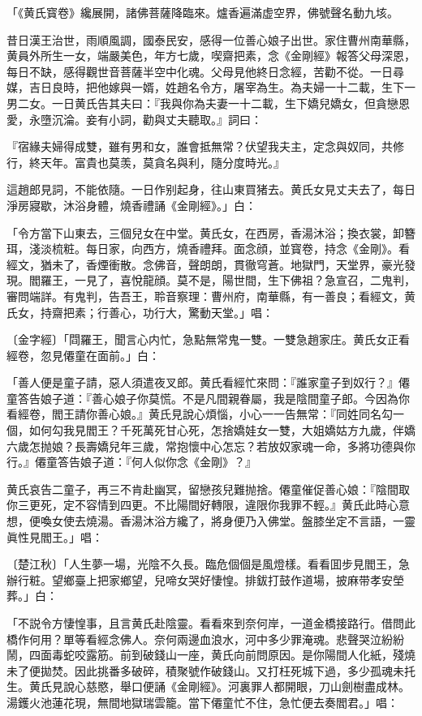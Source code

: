 \begin{myquote}[\markfont]
「《黄氏寳卷》纔展開，諸佛菩薩降臨來。爐香遍滿虚空界，佛號聲名動九垓。

昔日漢王治世，雨順風調，國泰民安，感得一位善心娘子出世。家住曹州南華縣，黄員外所生一女，端嚴美色，年方七歲，喫齋把素，念《金剛經》報答父母深恩，每日不缺，感得觀世音菩薩半空中化魂。父母見他終日念經，苦勸不從。一日尋媒，吉日良時，把他嫁與一婿，姓趙名令方，屠宰為生。為夫婦一十二載，生下一男二女。一日黄氏告其夫曰：『我與你為夫妻一十二載，生下嬌兒嬌女，但貪戀恩愛，永墮沉淪。妾有小詞，勸與丈夫聽取。』詞曰：

{\kaishu『宿緣夫婦得成雙，雖有男和女，誰會抵無常？伏望我夫主，定念與奴同，共修行，終天年。富貴也莫羡，莫貪名與利，隨分度時光。』}

這趙郎見詞，不能依隨。一日作别起身，往山東買猪去。黄氏女見丈夫去了，每日淨房寢歇，沐浴身體，燒香禮誦《金剛經》。」{\small{白}}：

「令方當下山東去，三個兒女在中堂。黄氏女，在西房，香湯沐浴；換衣裳，卸簪珥，淺淡梳粧。每日家，向西方，燒香禮拜。面念顔，並寳卷，持念《金剛》。看經文，猶未了，香煙衝散。念佛音，聲朗朗，貫徹穹蒼。地獄門，天堂界，豪光發現。閻羅王，一見了，喜悅龍顔。莫不是，陽世間，生下佛祖？急宣召，二鬼判，審問端詳。有鬼判，告吾王，聆音察理：曹州府，南華縣，有一善良；看經文，黄氏女，持齋把素；行善心，功行大，驚動天堂。」唱：

〔金字經〕{\kaishu「閰羅王，聞言心内忙，急點無常鬼一雙。一雙急趙家庄。黄氏女正看經卷，忽見僊童在面前。」}{\small{白}}：

「善人便是童子請，惡人須遣夜叉郎。黄氏看經忙來問：『誰家童子到奴行？』僊童答告娘子道：『善心娘子你莫慌。不是凡間親眷屬，我是陰間童子郎。今因為你看經卷，閻王請你善心娘。』黄氏見說心煩惱，小心一一告無常：『同姓同名勾一個，如何勾我見閻王？千死萬死甘心死，怎捨嬌娃女一雙，大姐嬌姑方九歲，伴嬌六歲怎抛娘？長壽嬌兒年三歲，常抱懷中心怎忘？若放奴家魂一命，多將功德與你行。』僊童答告娘子道：『何人似你念《金剛》？』

黄氏哀告二童子，再三不肯赴幽冥，留戀孩兒難抛捨。僊童催促善心娘：『陰間取你三更死，定不容情到四更。不比陽間好轉限，違限你我罪不輕。』黄氏此時心意想，便喚女使去燒湯。香湯沐浴方纔了，將身便乃入佛堂。盤膝坐定不言語，一靈眞性見閻王。」{\small{唱}}：

〔楚江秋〕{\kaishu「人生夢一場，光陰不久長。臨危個個是風燈樣。看看囬步見閻王，急辦行粧。望鄉臺上把家鄉望，兒啼女哭好悽惶。排鈸打鼓作道場，披麻带孝安塋葬。」}{\small{白}}：

「不説令方悽惶事，且言黄氏赴陰靈。看看來到奈何岸，一道金橋接路行。借問此橋作何用？單等看經念佛人。奈何兩邊血浪水，河中多少罪淹魂。悲聲哭泣紛紛鬧，四面毒蛇咬露筋。前到破錢山一座，黄氏向前問原因。是你陽間人化紙，殘燒未了便拋焚。因此挑番多破碎，積聚號作破錢山。又打枉死城下過，多少孤魂未托生。黄氏見說心慈愍，舉口便誦《金剛經》。河裏罪人都開眼，刀山劍樹盡成林。湯鑊火池蓮花現，無間地獄瑞雲籠。當下僊童忙不住，急忙便去奏閻君。」{\small{唱}}：


\end{myquote}
